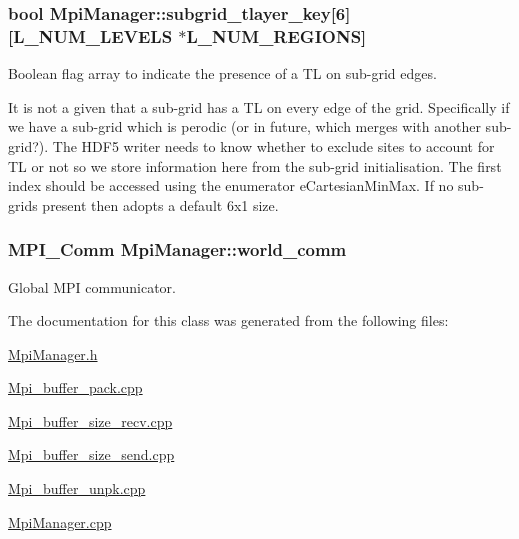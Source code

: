\subsubsection[{\texorpdfstring{subgrid\+\_\+tlayer\+\_\+key}{subgrid_tlayer_key}}]{\setlength{\rightskip}{0pt plus 5cm}bool Mpi\+Manager\+::subgrid\+\_\+tlayer\+\_\+key\mbox{[}6\mbox{]}\mbox{[}{\bf L\+\_\+\+N\+U\+M\+\_\+\+L\+E\+V\+E\+LS} $\ast${\bf L\+\_\+\+N\+U\+M\+\_\+\+R\+E\+G\+I\+O\+NS}\mbox{]}}\hypertarget{class_mpi_manager_a18d53c4f9968cccec36127d33776e3d4}{}\label{class_mpi_manager_a18d53c4f9968cccec36127d33776e3d4}


Boolean flag array to indicate the presence of a TL on sub-\/grid edges. 

It is not a given that a sub-\/grid has a TL on every edge of the grid. Specifically if we have a sub-\/grid which is perodic (or in future, which merges with another sub-\/grid?). The H\+D\+F5 writer needs to know whether to exclude sites to account for TL or not so we store information here from the sub-\/grid initialisation. The first index should be accessed using the enumerator e\+Cartesian\+Min\+Max. If no sub-\/grids present then adopts a default 6x1 size. 
\subsubsection[{\texorpdfstring{world\+\_\+comm}{world_comm}}]{\setlength{\rightskip}{0pt plus 5cm}M\+P\+I\+\_\+\+Comm Mpi\+Manager\+::world\+\_\+comm}\hypertarget{class_mpi_manager_aec1ed834d1a8fa19f87499fb0d5cd332}{}\label{class_mpi_manager_aec1ed834d1a8fa19f87499fb0d5cd332}


Global M\+PI communicator. 



The documentation for this class was generated from the following files\+:\begin{DoxyCompactItemize}
\item 
\hyperlink{_mpi_manager_8h}{Mpi\+Manager.\+h}\item 
\hyperlink{_mpi__buffer__pack_8cpp}{Mpi\+\_\+buffer\+\_\+pack.\+cpp}\item 
\hyperlink{_mpi__buffer__size__recv_8cpp}{Mpi\+\_\+buffer\+\_\+size\+\_\+recv.\+cpp}\item 
\hyperlink{_mpi__buffer__size__send_8cpp}{Mpi\+\_\+buffer\+\_\+size\+\_\+send.\+cpp}\item 
\hyperlink{_mpi__buffer__unpk_8cpp}{Mpi\+\_\+buffer\+\_\+unpk.\+cpp}\item 
\hyperlink{_mpi_manager_8cpp}{Mpi\+Manager.\+cpp}\end{DoxyCompactItemize}
